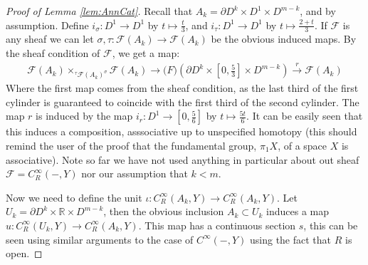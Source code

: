 \documentclass{article}
\newtheorem{proposed work}[theorem]{Proposed Work}
\begin{document}
\begin{proof}[Proof of Lemma \ref{lem:AnnCat}]
Recall that $A_k=\partial D^k \times D^1 \times D^{m-k}$, and by assumption. Define $i_\sigma: D^1 \to D^1$ by $t\mapsto \frac{t}{3}$, and $i_\tau:D^1\to D^1$ by $t\mapsto \frac{2+t}{3}$. If $\mathcal{F}$ is any sheaf we can let $\sigma,\tau :\mathcal{F}(A_k)\to \mathcal{F}(A_k)$ be the obvious induced maps. By the sheaf condition of $\mathcal{F}$, we get a map:
\begin{align*}
\mathcal{F}(A_k)\times_{{}^\tau\mathcal{F}(A_k)^\sigma} \mathcal{F}(A_k)\to \mathcal(F)(\partial D^k\times [0,\frac{5}{3}] \times D^{m-k}) \stackrel{r}{\to}  \mathcal{F}(A_k)
\end{align*} 
Where the first map comes from the sheaf condition, as the last third of the first cylinder is guaranteed to coincide with the first third of the second cylinder. The map $r$ is induced by the map $i_r:D^1\to [0,\frac{5}{6}]$ by $t\mapsto \frac{5t}{6}$. It can be easily seen that this induces a composition, asssociative up to unspecified homotopy (this should remind the user of the proof that the fundamental group, $\pi_1X$, of a space $X$ is associative). Note so far we have not used anything in particular about out sheaf $\mathcal{F}=C^\infty_R(-,Y)$ nor our assumption that $k<m$.

Now we need to define the unit $\iota: C^\infty_R(A_k,Y)\to C^\infty_R(A_k,Y)$. Let $U_k=\partial D^k \times \mathbb{R} \times D^{m-k}$, then the obvious inclusion $A_k\subset U_k$ induces a map $u:C^\infty_R(U_k,Y)\to C^\infty_R(A_k,Y)$. This map has a continuous section $s$, this can be seen using similar arguments to the case of $C^\infty(-, Y)$ using the fact that $R$ is open.


\end{proof}
\end{document}
